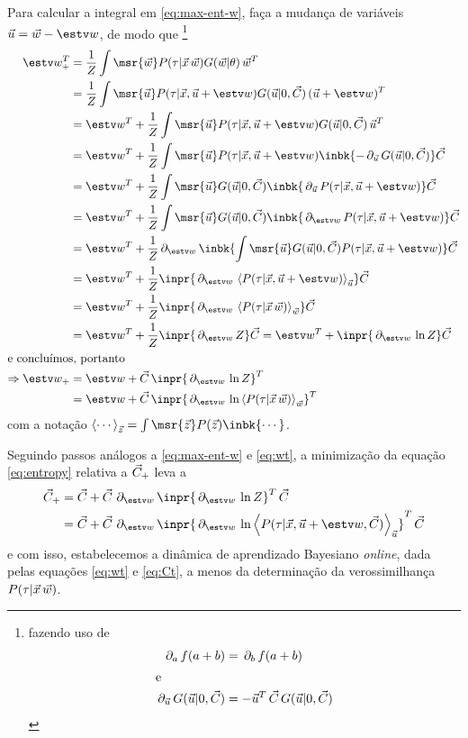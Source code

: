 \newcommand{\rlu}{\ensuremath{\vec{u}}}
\newcommand{\gu}{\ensuremath{G(\rlu|0,\Ct)}}
\newcommand{\lklu}{\ensuremath{P(\tau|\vec{x},\rlu+\wt)}}
\newcommand{\delwt}{\ensuremath{\del{\wt}}}
\newcommand{\Ex}[1]{\ensuremath{\left<#1\right>}} Para calcular a integral em
\eqref{eq:max-ent-w}, faça a mudança de variáveis $\rlu = \rl - \wt$, de modo
que
\footnote{fazendo uso de
\begin{align*}
    \del{a} f(a+b) & = \del{b} f(a+b) \\
    \intertext{e}
    \del{\rlu}\gu & = -\rlu^T\,\Ct\,\gu
\end{align*}
}
\begin{align}\label{eq:wt}
    \wT^T & = \frac{1}{\partf}\int\msr{\rl}\lkl\gt\,\rl^T \notag \\
    & = \frac{1}{\partf}\int\msr{\rlu}\lklu\gu\,(\rlu+\wt)^T \notag \\
    & = \wt^T + \frac{1}{\partf}\int\msr{\rlu}\lklu\gu\,\rlu^T \notag \\
    & = \wt^T + \frac{1}{\partf}\int\msr{\rlu}\lklu\inbk{-\del{\vec{u}}\gu}\Ct \notag \\
    & = \wt^T + \frac{1}{\partf}\int\msr{\rlu}\gu\inbk{\del{\vec{u}}\lklu}\Ct \notag \\
    & = \wt^T + \frac{1}{\partf}\int\msr{\rlu}\gu\inbk{\delwt\lklu}\Ct \notag \\
    & = \wt^T + \frac{1}{\partf}\delwt\inbk{\int\msr{\rlu}\gu\lklu}\Ct \notag \\
    & = \wt^T + \frac{1}{\partf}\inpr{\delwt\Ex{\lklu}_{\rlu}}\Ct \notag \\
    & = \wt^T + \frac{1}{\partf}\inpr{\delwt\Ex{\lkl}_{\rl}}\Ct \notag \\
    & = \wt^T + \frac{1}{\partf}\inpr{\delwt\partf}\Ct
    = \wt^T + \inpr{\delwt\ln\partf}\Ct \notag \\
    \intertext{e concluímos, portanto}
    \Rightarrow \wT & = \wt + \Ct\,\inpr{\delwt \ln \partf}^T \notag \\
    & = \wt + \Ct\,\inpr{\delwt \ln \Ex{\lkl}_{\rl}}^T
\end{align}
com a notação $\Ex{\cdots}_{\vec{z}}=\int\msr{\vec{z}}P(\vec{z})\inbk{\cdots}$.

Seguindo passos análogos a \eqref{eq:max-ent-w} e \eqref{eq:wt}, a minimização
da equação \eqref{eq:entropy} relativa a $\vec{C}_+$ leva a
\begin{align}\label{eq:Ct}
  \CT & = \Ct + \Ct\,\delwt \inpr{\delwt \ln \partf}^T\,\Ct \notag \\
  & = \Ct + \Ct\,\delwt \inpr{\delwt \ln\Ex{P(\tau|\vec{x},\rlu+\wt,\Ct)}_{\rlu}}^T\,\Ct
\end{align}
e com isso, estabelecemos a dinâmica de aprendizado Bayesiano \emph{online},
dada pelas equações \eqref{eq:wt} e \eqref{eq:Ct}, a menos da determinação da
verossimilhança $P(\tau|\vec{x}\,\vec{w})$.

